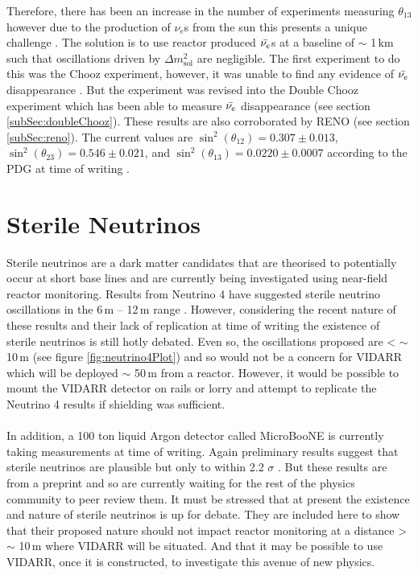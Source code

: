 Therefore, there has been an increase in the number of experiments measuring $\theta_{13}$ however due to the production of $\nu_e$s from the sun this presents a unique challenge \cite{Olive_2014}. The solution is to use reactor produced $\Bar{\nu_e}$s at a baseline of $\sim$ 1\,km such that oscillations driven by $\Delta m_{\textrm{sol}}^2$ are negligible. The first experiment to do this was the Chooz experiment, however, it was unable to find any evidence of $\Bar{\nu_e}$ disappearance \cite{Olive_2014}. But the experiment was revised into the Double Chooz experiment which has been able to measure $\Bar{\nu_e}$ disappearance (see section  \ref{subSec:doubleChooz}). These results are also corroborated by RENO (see section \ref{subSec:reno}). The current values are $\sin^2(\theta_{12}) = 0.307 \pm 0.013$, $\sin^2(\theta_{23}) = 0.546 \pm 0.021$, and $\sin^2(\theta_{13}) = 0.0220 \pm 0.0007$ according to the PDG at time of writing \cite{Zyla_pdg_2020}.


\section{Sterile Neutrinos}
Sterile neutrinos are a dark matter candidates that are theorised to potentially occur at short base lines and are currently being investigated using near-field reactor monitoring. Results from Neutrino 4 have suggested sterile neutrino oscillations in the 6\,m -- 12\,m range \cite{neutrino4_2021}. However, considering the recent nature of these results and their lack of replication at time of writing the existence of sterile neutrinos is still hotly debated. Even so, the oscillations proposed are < $\sim$ 10\,m \cite{neutrino4_2021} (see figure \ref{fig:neutrino4Plot}) and so would not be a concern for  VIDARR which will be deployed $\sim$ 50\,m from a reactor. However, it would be possible to mount the VIDARR detector on rails or lorry and attempt to replicate the Neutrino 4 results if shielding was sufficient. 
\\\\In addition, a 100 ton liquid Argon detector called MicroBooNE \cite{Karagiorgi_2012} is currently taking measurements at time of writing. Again preliminary results suggest that sterile neutrinos are plausible but only to within 2.2 $\sigma$ \cite{denton2021sterile}. But these results are from a preprint and so are currently waiting for the rest of the physics community to peer review them. It must be stressed that at present the existence and nature of sterile neutrinos is up for debate. They are included here to show that their proposed nature should not impact reactor monitoring at a distance > $\sim$ 10\,m  where VIDARR will be situated. And that it may be possible to use VIDARR, once it is constructed, to investigate this avenue of new physics.

